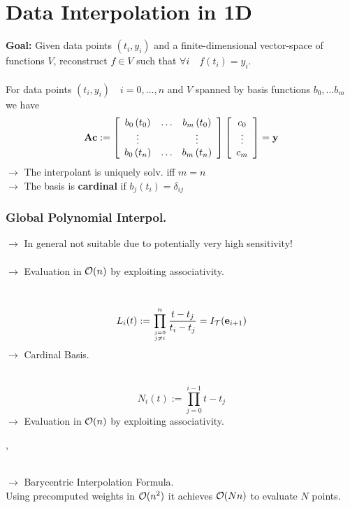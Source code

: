 \columnbreak
\part{Data Interpolation in 1D}
\setcounter{section}{0}

\textbf{Goal:} Given data points $(t_i, y_i)$ and a finite-dimensional vector-space of functions $V$, reconstruct $f\in V$ such that $\forall i \quad f(t_i)=y_i$. \\

 \\
For data points $(t_i, y_i) \quad i=0,\dots,n$
and $V$ spanned by basis functions $b_0,\dots b_m$ we have
$$
\mathbf{A} \mathbf{c}:=\left[\begin{array}{ccc}
b_{0}\left(t_{0}\right) & \ldots & b_{m}\left(t_{0}\right) \\
\vdots & & \vdots \\
b_{0}\left(t_{n}\right) & \ldots & b_{m}\left(t_{n}\right)
\end{array}\right]\left[\begin{array}{c}
c_{0} \\
\vdots \\
c_{m}
\end{array}\right]=\mathbf{y}
$$
$\rightarrow$ The interpolant is uniquely solv. iff $m=n$\\
$\rightarrow$ The basis is \textbf{cardinal} if $b_{j}\left(t_{i}\right)=\delta_{i j}$

\section{Global Polynomial Interpol.}
$\rightarrow$ In general not suitable due to potentially very high sensitivity! \\

\\
$\rightarrow$ Evaluation in $\mathcal{O}(n)$ by exploiting associativity.

\\
$$L_{i}(t):=\prod_{j=0 \atop j \neq i}^{n} \frac{t-t_{j}}{t_{i}-t_{j}} = I_\mathcal{T}(\mathbf{e}_{i+1})$$
$\rightarrow$ Cardinal Basis.

\\
$$N_{i}(t):=\prod_{j=0}^{i-1} t-t_{j}$$
$\rightarrow$ Evaluation in $\mathcal{O}(n)$ by exploiting associativity.

\sep

 \\
$\rightarrow$ Barycentric Interpolation Formula. \\
Using precomputed weights in $\mathcal{O}(n^2)$ it achieves $\mathcal{O}(N n)$ to evaluate $N$ points.

